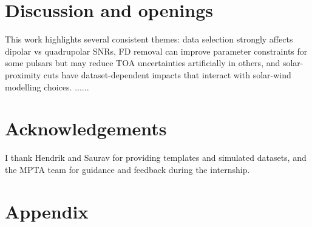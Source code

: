 \documentclass[12pt,a4paper]{article}
\begin{document}
\section{Discussion and openings}
This work highlights several consistent themes: data selection strongly affects dipolar vs quadrupolar SNRs, FD removal can improve parameter constraints for some pulsars but may reduce TOA uncertainties artificially in others, and solar-proximity cuts have dataset-dependent impacts that interact with solar-wind modelling choices. ......

\section*{Acknowledgements}
I thank Hendrik and Saurav for providing templates and simulated datasets, and the MPTA team for guidance and feedback during the internship.

\section*{Appendix}
\end{document}
